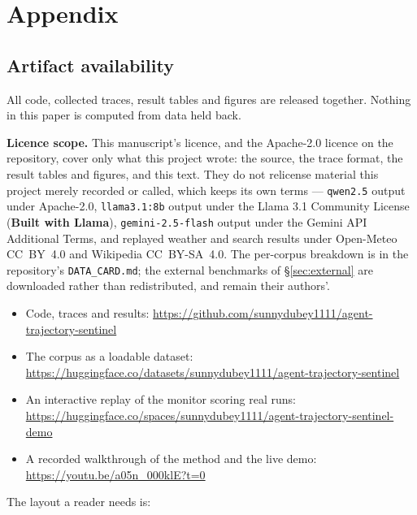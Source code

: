 \documentclass{article}
\begin{document}
\section*{Appendix}
\sloppy

\subsection*{Artifact availability}

All code, collected traces, result tables and figures are released together. Nothing in this paper is computed from data held back.

\textbf{Licence scope.} This manuscript's licence, and the Apache-2.0 licence on the repository, cover only what this project wrote: the source, the trace format, the result tables and figures, and this text. They do not relicense material this project merely recorded or called, which keeps its own terms --- \texttt{qwen2.5} output under Apache-2.0, \texttt{llama3.1:8b} output under the Llama 3.1 Community License (\textbf{Built with Llama}), \texttt{gemini-2.5-flash} output under the Gemini API Additional Terms, and replayed weather and search results under Open-Meteo CC~BY~4.0 and Wikipedia CC~BY-SA~4.0. The per-corpus breakdown is in the repository's \texttt{DATA\_CARD.md}; the external benchmarks of \S\ref{sec:external} are downloaded rather than redistributed, and remain their authors'.

\begin{itemize}
\item Code, traces and results: \url{https://github.com/sunnydubey1111/agent-trajectory-sentinel}
\item The corpus as a loadable dataset: \url{https://huggingface.co/datasets/sunnydubey1111/agent-trajectory-sentinel}
\item An interactive replay of the monitor scoring real runs: \url{https://huggingface.co/spaces/sunnydubey1111/agent-trajectory-sentinel-demo}
\item A recorded walkthrough of the method and the live demo: \url{https://youtu.be/a05n_000klE?t=0}
\end{itemize}

\noindent The layout a reader needs is:
\end{document}
